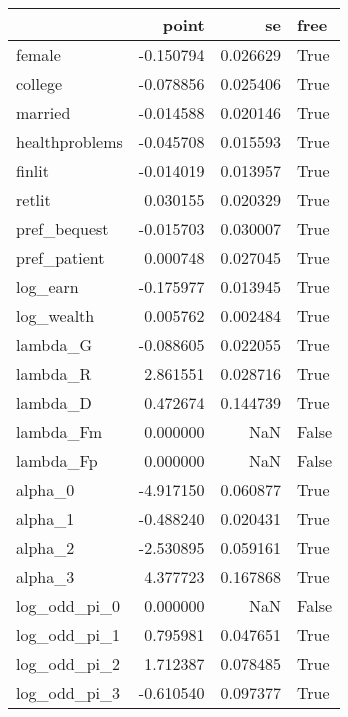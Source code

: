 \begin{tabular}{lrrl}
\toprule
{} &     point &        se &   free \\
\midrule
female         & -0.150794 &  0.026629 &   True \\
college        & -0.078856 &  0.025406 &   True \\
married        & -0.014588 &  0.020146 &   True \\
healthproblems & -0.045708 &  0.015593 &   True \\
finlit         & -0.014019 &  0.013957 &   True \\
retlit         &  0.030155 &  0.020329 &   True \\
pref\_bequest   & -0.015703 &  0.030007 &   True \\
pref\_patient   &  0.000748 &  0.027045 &   True \\
log\_earn       & -0.175977 &  0.013945 &   True \\
log\_wealth     &  0.005762 &  0.002484 &   True \\
lambda\_G       & -0.088605 &  0.022055 &   True \\
lambda\_R       &  2.861551 &  0.028716 &   True \\
lambda\_D       &  0.472674 &  0.144739 &   True \\
lambda\_Fm      &  0.000000 &       NaN &  False \\
lambda\_Fp      &  0.000000 &       NaN &  False \\
alpha\_0        & -4.917150 &  0.060877 &   True \\
alpha\_1        & -0.488240 &  0.020431 &   True \\
alpha\_2        & -2.530895 &  0.059161 &   True \\
alpha\_3        &  4.377723 &  0.167868 &   True \\
log\_odd\_pi\_0   &  0.000000 &       NaN &  False \\
log\_odd\_pi\_1   &  0.795981 &  0.047651 &   True \\
log\_odd\_pi\_2   &  1.712387 &  0.078485 &   True \\
log\_odd\_pi\_3   & -0.610540 &  0.097377 &   True \\
\bottomrule
\end{tabular}
